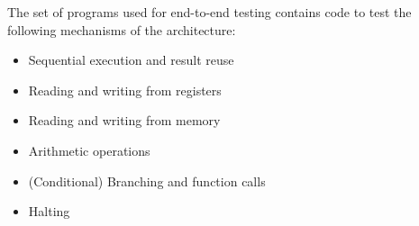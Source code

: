 The set of programs used for end-to-end testing contains code to test the following mechanisms of the architecture:

\begin{itemize}
    \item Sequential execution and result reuse
    \item Reading and writing from registers
    \item Reading and writing from memory
    \item Arithmetic operations
    \item (Conditional) Branching and function calls
    \item Halting
\end{itemize}